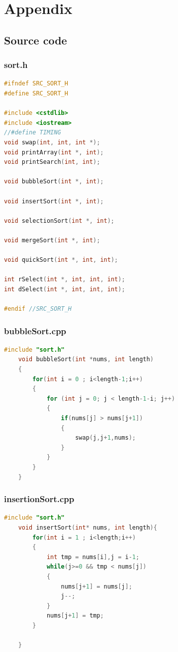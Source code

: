 \documentclass[12pt,a4paper]{article}
\theoremstyle{definition}
\begin{document}
\section*{Appendix}
\subsection{Source code}
\subsubsection*{sort.h}
\begin{lstlisting}[language=C++]
#ifndef SRC_SORT_H
#define SRC_SORT_H

#include <cstdlib>
#include <iostream>
//#define TIMING
void swap(int, int, int *);
void printArray(int *, int);
void printSearch(int, int);

void bubbleSort(int *, int);

void insertSort(int *, int);

void selectionSort(int *, int);

void mergeSort(int *, int);

void quickSort(int *, int, int);

int rSelect(int *, int, int, int);
int dSelect(int *, int, int, int);

#endif //SRC_SORT_H

\end{lstlisting}
\subsubsection*{bubbleSort.cpp}
\begin{lstlisting}[language=C++]
    #include "sort.h"
    void bubbleSort(int *nums, int length)
    {
        for(int i = 0 ; i<length-1;i++)
        {
            for (int j = 0; j < length-1-i; j++)
            {
                if(nums[j] > nums[j+1])
                {
                    swap(j,j+1,nums);
                }
            }
        }
    }

\end{lstlisting}
\subsubsection*{insertionSort.cpp}
\begin{lstlisting}[language=C++]
    #include "sort.h"
    void insertSort(int* nums, int length){
        for(int i = 1 ; i<length;i++)
        {
            int tmp = nums[i],j = i-1;
            while(j>=0 && tmp < nums[j])
            {
                nums[j+1] = nums[j];
                j--;
            }
            nums[j+1] = tmp;
        }
    
    }   
\end{lstlisting}
\end{document}
